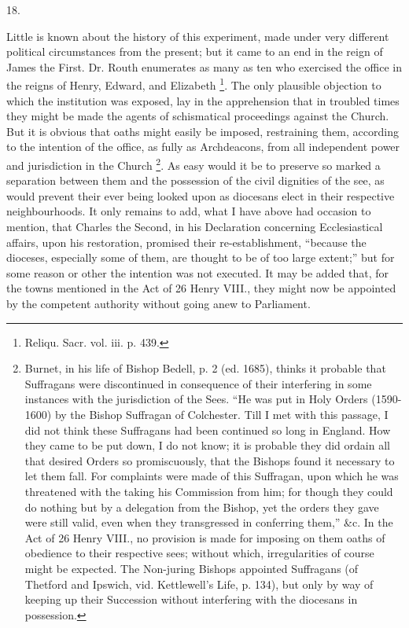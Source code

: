 18.

Little is known about the history of this
experiment, made under very different political circumstances from the
present; but it came to an end in the reign of James the First. Dr.
Routh enumerates as many as ten who exercised the office in the reigns
of Henry, Edward, and Elizabeth \footnote{Reliqu. Sacr. vol. iii. p. 439.}. The only plausible objection to which the institution was
exposed, lay in the apprehension that in troubled times they might be
made the agents of schismatical proceedings against the Church. But it
is obvious that oaths might easily be imposed, restraining them,
according to the intention of the office, as fully as Archdeacons,
from all independent power and jurisdiction in the Church \footnote{Burnet, in his life of Bishop Bedell, p. 2 (ed. 1685), thinks it
probable that Suffragans were discontinued in consequence of their
interfering in some instances with the jurisdiction of the Sees. ``He
was put in Holy Orders (1590-1600) by the Bishop Suffragan of
Colchester. Till I met with this passage, I did not think these
Suffragans had been continued so long in England. How they came to be
put down, I do not know; it is probable they did ordain all that
desired Orders so promiscuously, that the Bishops found it necessary
to let them fall. For complaints were made of this Suffragan, upon
which he was threatened with the taking his Commission from him; for
though they could do nothing but by a delegation from the Bishop, yet
the orders they gave were still valid, even when they transgressed in
conferring them,'' \&c. In the Act of 26 Henry VIII., no provision
is made for imposing on them oaths of obedience to their respective
sees; without which, irregularities of course might be expected. The
Non-juring Bishops appointed Suffragans (of Thetford and Ipswich, vid.
Kettlewell's Life, p. 134), but only by way of keeping up their
Succession without interfering with the diocesans in possession.}. As easy would it be to preserve so marked a separation
between them and the possession of the civil dignities of the see, as
would prevent their ever being looked upon as diocesans elect in their
respective neighbourhoods. It only remains to add, what I have above
had occasion to mention, that Charles the Second, in his Declaration
concerning Ecclesiastical affairs, upon his restoration, promised
their re-establishment, ``because the dioceses, especially some of
them, are thought to be of too large extent;'' but for some reason or
other the intention was not executed. It may be added that, for the
towns mentioned in the Act of 26 Henry VIII., they might now be
appointed by the competent authority without going anew to Parliament.

